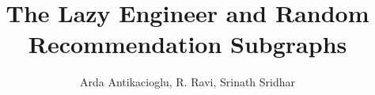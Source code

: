 \documentclass[11pt]{article}
\begin{document}
\title{The Lazy Engineer and Random Recommendation Subgraphs}
\author{Arda Antikacioglu, R. Ravi, Srinath Sridhar}
\maketitle


%







{}

\end{document}
